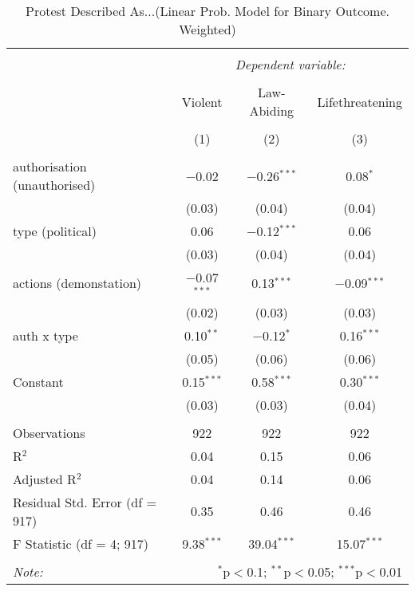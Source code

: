 
\begin{table}[!htbp] \centering 
  \caption{Protest Described As...(Linear Prob. Model for Binary Outcome. Weighted)} 
  \label{} 
\begin{tabular}{@{\extracolsep{5pt}}lccc} 
\\[-1.8ex]\hline 
\hline \\[-1.8ex] 
 & \multicolumn{3}{c}{\textit{Dependent variable:}} \\ 
\cline{2-4} 
\\[-1.8ex] & Violent & Law-Abiding & Lifethreatening \\ 
\\[-1.8ex] & (1) & (2) & (3)\\ 
\hline \\[-1.8ex] 
 authorisation (unauthorised) & $-$0.02 & $-$0.26$^{***}$ & 0.08$^{*}$ \\ 
  & (0.03) & (0.04) & (0.04) \\ 
  type (political) & 0.06 & $-$0.12$^{***}$ & 0.06 \\ 
  & (0.03) & (0.04) & (0.04) \\ 
  actions (demonstation) & $-$0.07$^{***}$ & 0.13$^{***}$ & $-$0.09$^{***}$ \\ 
  & (0.02) & (0.03) & (0.03) \\ 
  auth x type & 0.10$^{**}$ & $-$0.12$^{*}$ & 0.16$^{***}$ \\ 
  & (0.05) & (0.06) & (0.06) \\ 
  Constant & 0.15$^{***}$ & 0.58$^{***}$ & 0.30$^{***}$ \\ 
  & (0.03) & (0.03) & (0.04) \\ 
 \hline \\[-1.8ex] 
Observations & 922 & 922 & 922 \\ 
R$^{2}$ & 0.04 & 0.15 & 0.06 \\ 
Adjusted R$^{2}$ & 0.04 & 0.14 & 0.06 \\ 
Residual Std. Error (df = 917) & 0.35 & 0.46 & 0.46 \\ 
F Statistic (df = 4; 917) & 9.38$^{***}$ & 39.04$^{***}$ & 15.07$^{***}$ \\ 
\hline 
\hline \\[-1.8ex] 
\textit{Note:}  & \multicolumn{3}{r}{$^{*}$p$<$0.1; $^{**}$p$<$0.05; $^{***}$p$<$0.01} \\ 
\end{tabular} 
\end{table} 
